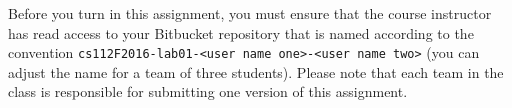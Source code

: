 \vspace*{-.05in}

Before you turn in this assignment, you must ensure that the course instructor has read access to your Bitbucket
repository that is named according to the convention {\tt cs112F2016-lab01-<user name one>-<user name two>} (you can
adjust the name for a team of three students). Please note that each team in the class is responsible for submitting one
version of this assignment.



